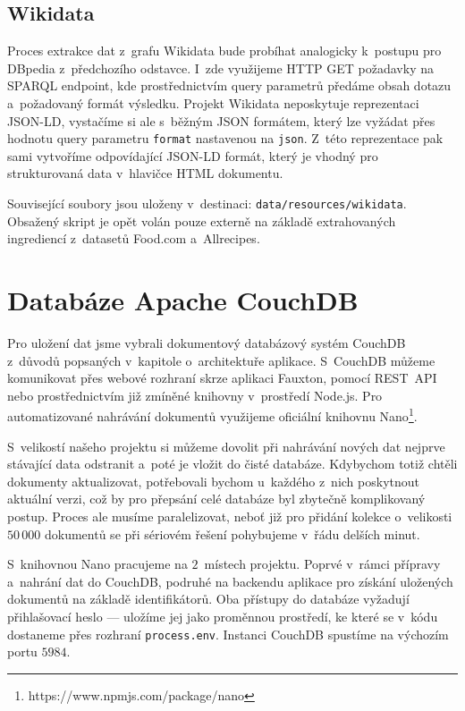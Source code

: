 \subsection{Wikidata}

Proces extrakce dat z~grafu Wikidata bude probíhat analogicky k~postupu pro DBpedia z~předchozího odstavce. I~zde využijeme HTTP GET požadavky na SPARQL endpoint, kde prostřednictvím query parametrů předáme obsah dotazu a~požadovaný formát výsledku. Projekt Wikidata neposkytuje reprezentaci JSON-LD, vystačíme si ale s~běžným JSON formátem, který lze vyžádat přes hodnotu query parametru \texttt{format} nastavenou na \texttt{json}. Z~této reprezentace pak sami vytvoříme odpovídající JSON-LD formát, který je vhodný pro strukturovaná data v~hlavičce HTML dokumentu.

Související soubory jsou uloženy v~destinaci: \texttt{data/resources/wikidata}. Obsažený skript je opět volán pouze externě na základě extrahovaných ingrediencí z~datasetů Food.com a~Allrecipes. 

\section{Databáze Apache CouchDB}

Pro uložení dat jsme vybrali dokumentový databázový systém CouchDB z~důvodů popsaných v~kapitole o~architektuře aplikace.  S~CouchDB můžeme komunikovat přes webové rozhraní skrze aplikaci Fauxton, pomocí REST~API nebo prostřednictvím již zmíněné knihovny v~prostředí Node.js. Pro automatizované nahrávání dokumentů využijeme oficiální knihovnu Nano\footnote{https://www.npmjs.com/package/nano}.

S~velikostí našeho projektu si můžeme dovolit při nahrávání nových dat nejprve stávající data odstranit a~poté je vložit do čisté databáze. Kdybychom totiž chtěli dokumenty aktualizovat, potřebovali bychom u~každého z~nich poskytnout aktuální verzi, což by pro přepsání celé databáze byl zbytečně komplikovaný postup. Proces ale musíme paralelizovat, neboť již pro přidání kolekce o~velikosti $50\,000$ dokumentů se při sériovém řešení pohybujeme v~řádu delších minut.

S~knihovnou Nano pracujeme na $2$~místech projektu. Poprvé v~rámci přípravy a~nahrání dat do CouchDB, podruhé na backendu aplikace pro získání uložených dokumentů na základě identifikátorů. Oba přístupy do databáze vyžadují přihlašovací heslo --- uložíme jej jako proměnnou prostředí, ke které se v~kódu dostaneme přes rozhraní \texttt{process.env}. Instanci CouchDB spustíme na výchozím portu $5984$.


